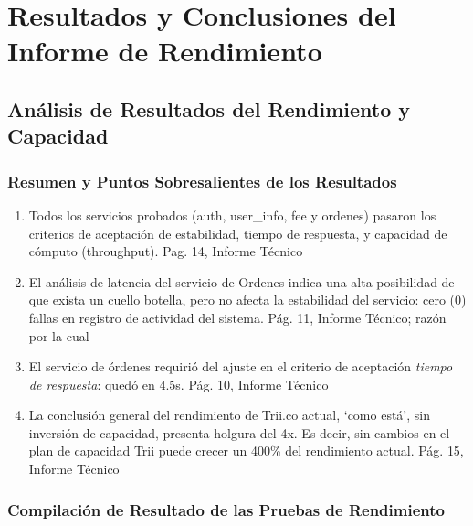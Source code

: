 \documentclass[
  paper=a4,
  ,captions=tableheading
]{scrartcl}
\providecommand{\tightlist}{%
  \setlength{\itemsep}{0pt}\setlength{\parskip}{0pt}}
\renewenvironment{quote}{\begin{customblockquote}\list{}{\rightmargin=0em\leftmargin=0em}%
\item\relax\color{blockquote-text}\ignorespaces}{\unskip\unskip\endlist\end{customblockquote}}
\begin{document}
\newpage

\section{Resultados y Conclusiones del Informe de
Rendimiento}\label{sec:resultados-y-conclusiones-del-informe-de-rendimiento}

\subsection{Análisis de Resultados del Rendimiento y
Capacidad}\label{sec:anuxe1lisis-de-resultados-del-rendimiento-y-capacidad}

\begin{quote}
\end{quote}

\subsubsection{Resumen y Puntos Sobresalientes de los
Resultados}\label{sec:resumen-y-puntos-sobresalientes-de-los-resultados}

\begin{enumerate}
\def\labelenumi{\arabic{enumi}.}
\tightlist
\item
  Todos los servicios probados (auth, user\_info, fee y ordenes) pasaron
  los criterios de aceptación de estabilidad, tiempo de respuesta, y
  capacidad de cómputo (throughput). Pag. 14, Informe Técnico
\item
  El análisis de latencia del servicio de Ordenes indica una alta
  posibilidad de que exista un cuello botella, pero no afecta la
  estabilidad del servicio: cero (0) fallas en registro de actividad del
  sistema. Pág. 11, Informe Técnico; razón por la cual
\item
  El servicio de órdenes requirió del ajuste en el criterio de
  aceptación \emph{tiempo de respuesta}: quedó en 4.5s. Pág. 10, Informe
  Técnico
\item
  La conclusión general del rendimiento de Trii.co actual, `como está',
  sin inversión de capacidad, presenta holgura del 4x. Es decir, sin
  cambios en el plan de capacidad Trii puede crecer un 400\% del
  rendimiento actual. Pág. 15, Informe Técnico
\end{enumerate}

\subsubsection{Compilación de Resultado de las Pruebas de
Rendimiento}\label{sec:compilaciuxf3n-de-resultado-de-las-pruebas-de-rendimiento}
\end{document}
